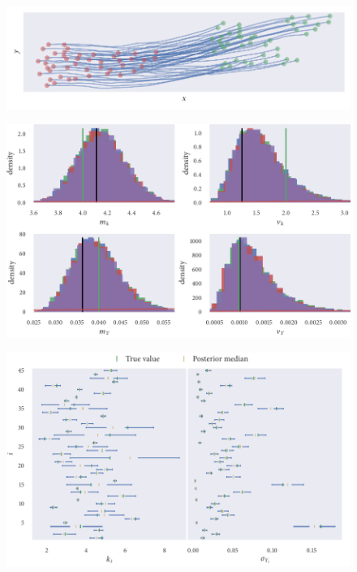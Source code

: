 \begin{figure}[tbp]
  \includegraphics{top_hier_sim.pdf}
  \caption{} 
\end{figure}
\begin{figure}[tbp]
  \includegraphics{top_hier_hist.pdf}
  \caption{} 
\end{figure}
\begin{figure}[tbp]
  \includegraphics{top_hier_summary.pdf}
  \caption{} 
\end{figure}

